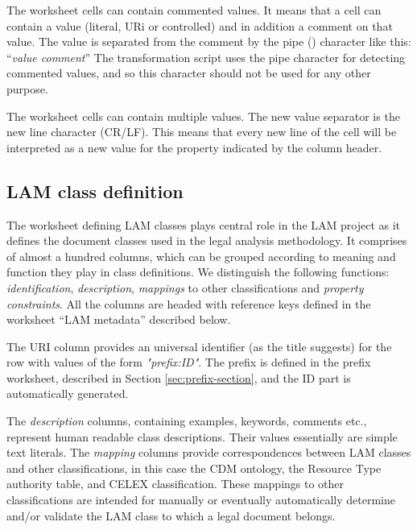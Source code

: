 The worksheet cells can contain commented values. It means that a cell
can contain a value (literal, URi or controlled) and in addition a
comment on that value. The value is separated from the comment by the
pipe (\textbar{}) character like this: ``\emph{value \textbar{}
comment}''  The transformation script uses the pipe character for
detecting commented values, and so this character should not be used for
any other purpose.

The worksheet cells can contain multiple values. The new value separator
is the new line character (CR/LF). This means that every new line of the
cell will be interpreted as a new value for the property indicated by
the column header.

\subsection{LAM class definition}
\label{sec:lam-class-definition}

The worksheet defining LAM classes plays central role in the LAM project
as it defines the document classes used in the legal analysis
methodology. It comprises of almost a hundred columns, which can be
grouped according to meaning and function they play in class
definitions. We distinguish the following functions:
\emph{identification}, \emph{description}, \emph{mappings} to other
classifications and \emph{property constraints}. All the columns are
headed with reference keys defined in the worksheet ``LAM metadata'' described below.

The URI column provides an universal identifier (as the title suggests)
for the row with values of the form \emph{"prefix:ID"}. The prefix is
defined in the prefix worksheet, described in Section \ref{sec:prefix-section}, and the ID part is automatically generated.

The \emph{description} columns, containing examples, keywords, comments
etc., represent human readable class descriptions. Their values
essentially are simple text literals. The \emph{mapping} columns provide
correspondences between LAM classes and other classifications, in this
case the CDM ontology, the Resource Type authority table, and CELEX
classification. These mappings to other classifications are intended for
manually or eventually automatically determine and/or validate the LAM
class to which a legal document belongs.


